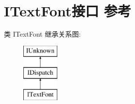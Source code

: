 \hypertarget{interface_i_text_font}{}\section{I\+Text\+Font接口 参考}
\label{interface_i_text_font}
类 I\+Text\+Font 继承关系图\+:\begin{figure}[H]
\begin{center}
\leavevmode
\includegraphics[height=3.000000cm]{interface_i_text_font}
\end{center}
\end{figure}
